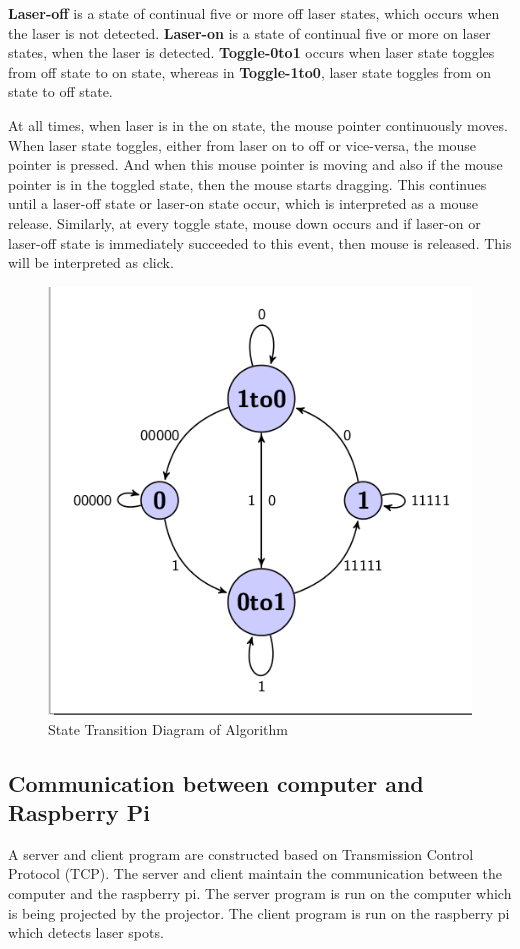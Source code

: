 \documentclass[12pt, a4paper]{article}
\begin{document}
	\textbf {Laser-off} is a state of continual five or more off laser states, which occurs when the laser is not detected. \textbf{Laser-on} is a state of continual five or more on laser states, when the laser is detected. \textbf{Toggle-0to1} occurs when laser state toggles from off state to on state, whereas in \textbf{Toggle-1to0}, laser state toggles from on state to off state. 
	
	At all times, when laser is in the on state, the mouse pointer continuously moves. When laser state toggles, either from laser on to off or vice-versa, the mouse pointer is pressed. And when this mouse pointer is moving and also if the mouse pointer is in the toggled state, then the mouse starts dragging. This continues until a laser-off state or laser-on state occur, which is interpreted as a mouse release. Similarly, at every toggle state, mouse down occurs and if laser-on or laser-off state is immediately succeeded to this event, then mouse is released. This will be interpreted as click.
	
\begin{figure}[htp]
\centering
\includegraphics[scale=0.35]{state.png}
\caption{State Transition Diagram of Algorithm}
\label{}
\end{figure}
	
\subsection{Communication between computer and Raspberry Pi}
	A server and client program are constructed based on Transmission Control Protocol (TCP). The server and client maintain the communication between the computer and the raspberry pi. The server program is run on the computer which is being projected by the projector. The client program is run on the raspberry pi which detects laser spots. 
	
\end{document}
